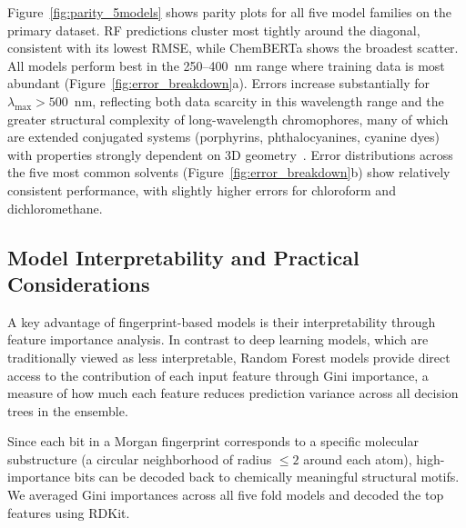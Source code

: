 \documentclass[journal=jcisd8,manuscript=article]{achemso}
\begin{document}
Figure~\ref{fig:parity_5models} shows parity plots for all five model families on the primary dataset.
RF predictions cluster most tightly around the diagonal, consistent with its lowest RMSE, while ChemBERTa shows the broadest scatter.
All models perform best in the 250--400~nm range where training data is most abundant (Figure~\ref{fig:error_breakdown}a).
Errors increase substantially for $\lambda_{\max} > 500$~nm, reflecting both data scarcity in this wavelength range and the greater structural complexity of long-wavelength chromophores, many of which are extended conjugated systems (porphyrins, phthalocyanines, cyanine dyes) with properties strongly dependent on 3D geometry~\cite{flemingMolecular2010}.
Error distributions across the five most common solvents (Figure~\ref{fig:error_breakdown}b) show relatively consistent performance, with slightly higher errors for chloroform and dichloromethane.


\subsection{Model Interpretability and Practical Considerations}
\label{sec:interpretability}

A key advantage of fingerprint-based models is their interpretability through feature importance analysis.
In contrast to deep learning models, which are traditionally viewed as less interpretable, Random Forest models provide direct access to the contribution of each input feature through Gini importance, a measure of how much each feature reduces prediction variance across all decision trees in the ensemble.

Since each bit in a Morgan fingerprint corresponds to a specific molecular substructure (a circular neighborhood of radius $\leq 2$ around each atom), high-importance bits can be decoded back to chemically meaningful structural motifs.
We averaged Gini importances across all five fold models and decoded the top features using RDKit.
\end{document}
